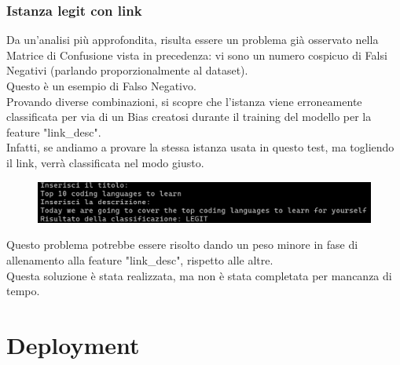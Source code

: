 \documentclass[a4paper,12pt]{report}
\begin{document}
\subsection{Istanza legit con link}
Da un'analisi più approfondita, risulta essere un problema già osservato nella Matrice di Confusione vista in precedenza: vi sono un numero cospicuo di Falsi Negativi (parlando proporzionalmente al dataset).\\
Questo è un esempio di Falso Negativo.\\
Provando diverse combinazioni, si scopre che l'istanza viene erroneamente classificata per via di un Bias creatosi durante il training del modello per la feature "link\_desc".\\
Infatti, se andiamo a provare la stessa istanza usata in questo test, ma togliendo il link, verrà classificata nel modo giusto.\\
\begin{figure}[h]
\centering
\includegraphics[width=\textwidth]{deploy_legit_link2.png}
\end{figure}
\hfill \break
Questo problema potrebbe essere risolto dando un peso minore in fase di allenamento alla feature "link\_desc", rispetto alle altre.\\
Questa soluzione è stata realizzata, ma non è stata completata per mancanza di tempo.
\newpage

\begingroup%
\makeatletter%
\let\clearpage\relax%
\vspace*{\fill}%
\vspace*{\dimexpr-50\p@-\baselineskip}%
\chapter{Deployment}
\vspace*{\fill}%
\endgroup
\newpage
\end{document}
